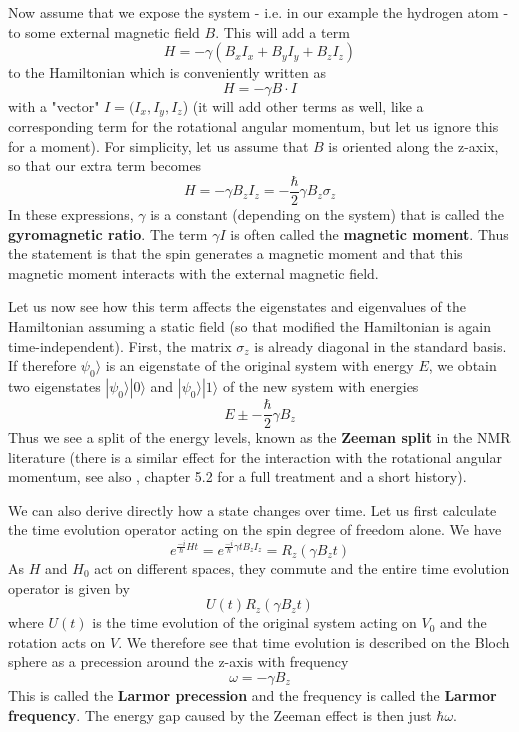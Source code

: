 \documentclass[a4paper, draft]{article}
\theoremstyle{own}
\theoremstyle{remark}
\begin{document}
Now assume that we expose the system - i.e. in our example the hydrogen atom - to some external magnetic field $B$. This will add a term
$$
H = - \gamma (B_x I_x + B_y I_y + B_z I_z )
$$
to the Hamiltonian which is conveniently written as
$$
H = -  \gamma B \cdot I
$$
with a "vector" $I = (I_x, I_y, I_z$) (it will add other terms as well, like a corresponding term for the rotational angular momentum, but let us ignore this for a moment). For simplicity, let us assume that $B$ is oriented along the z-axix, so that our extra term becomes
$$
H = - \gamma B_z I_z = - \frac{\hbar}{2} \gamma B_z \sigma_z
$$
In these expressions, $\gamma$ is a constant (depending on the system) that is called the {\bf gyromagnetic ratio}. The term $\gamma I$ is often called the {\bf magnetic moment}. Thus the statement is that the spin generates a magnetic moment and that this magnetic moment interacts with the external magnetic field.

Let us now see how this term affects the eigenstates and eigenvalues of the Hamiltonian assuming a static field (so that modified the Hamiltonian is again time-independent). First, the matrix $\sigma_z$ is already diagonal in the standard basis. If therefore $\psi_0 \rangle$ is an eigenstate of the original system with energy $E$, we obtain two eigenstates $|\psi_0 \rangle |0 \rangle$ and $|\psi_0 \rangle |1 \rangle$ of the new system with energies
$$
E \pm - \frac{\hbar}{2} \gamma B_z
$$
Thus we see a split of the energy levels, known as the {\bf Zeeman split} in the NMR literature (there is a similar effect for the interaction with the rotational angular momentum,  see also \cite{WeinbergQM}, chapter 5.2 for a full treatment and a short history). 

We can also derive directly how a state changes over time. Let us first calculate the time evolution operator acting on the spin degree of freedom alone. We have
$$
e^{\frac{-i}{\hbar}Ht}  = e^{\frac{-i}{\hbar} \gamma t B_z I_z} =   
R_z(\gamma B_z t)
$$
As $H$ and $H_0$ act on different spaces, they commute and the entire time evolution operator is given by
$$
U(t) R_z(\gamma B_z t)
$$
where $U(t)$ is the time evolution of the original system acting on $V_0$ and the rotation acts on $V$. We therefore see that time evolution is described on the Bloch sphere as a precession around the z-axis with frequency
$$
\omega = -\gamma B_z 
$$
This is called the {\bf Larmor precession} and the frequency is called the {\bf Larmor frequency}. The energy gap caused by the Zeeman effect is then just $\hbar \omega$. 
\end{document}
